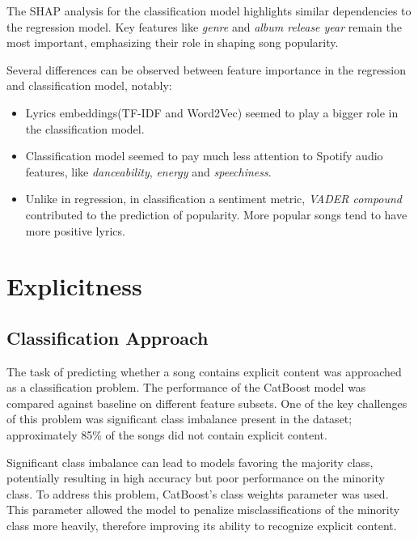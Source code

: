 The SHAP analysis for the classification model highlights similar dependencies
to the regression model. Key features like \textit{genre} and
\textit{album release year} remain the most important, emphasizing their role
in shaping song popularity. 

Several differences can be observed between feature importance in the
regression and classification model, notably:
\begin{itemize}
  \item Lyrics embeddings(TF-IDF and Word2Vec) seemed to play a bigger role in
    the classification model.
  \item Classification model seemed to pay much less attention to Spotify audio
    features, like \textit{danceability}, \textit{energy} and
    \textit{speechiness}.
  \item Unlike in regression, in classification a sentiment metric,
    \textit{VADER compound} contributed to the prediction of popularity. More
    popular songs tend to have more positive lyrics.
\end{itemize}


\section{Explicitness}
\label{sec:explicitness}

\subsection{Classification Approach}
The task of predicting whether a song contains explicit content was approached
as a classification problem. The performance of the CatBoost model was compared
against baseline on different feature subsets. One of the key challenges of
this problem was significant class imbalance present in the dataset;
approximately 85\% of the songs did not contain explicit content.

Significant class imbalance can lead to models favoring the majority class,
potentially resulting in  high accuracy but poor performance on the minority
class. To address this problem, CatBoost's class weights parameter was used.
This parameter allowed the model to penalize misclassifications of the minority
class more heavily, therefore improving its ability to recognize explicit
content.

